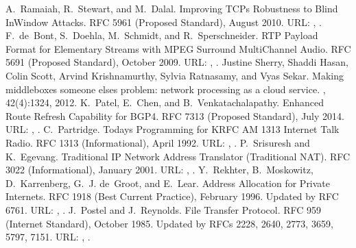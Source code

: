 \documentclass[letterpaper,10pt,english]{sphinxmanual}
\begin{document}
\begin{sphinxthebibliography}{10}
\sphinxAtStartPar
A. Ramaiah, R. Stewart, and M. Dalal. Improving TCP\textquotesingle{}s Robustness to Blind In\sphinxhyphen{}Window Attacks. RFC 5961 (Proposed Standard), August 2010. URL: , .
\sphinxAtStartPar
F. de Bont, S. Doehla, M. Schmidt, and R. Sperschneider. RTP Payload Format for Elementary Streams with MPEG Surround Multi\sphinxhyphen{}Channel Audio. RFC 5691 (Proposed Standard), October 2009. URL: , .
\sphinxAtStartPar
Justine Sherry, Shaddi Hasan, Colin Scott, Arvind Krishnamurthy, Sylvia Ratnasamy, and Vyas Sekar. Making middleboxes someone else\textquotesingle{}s problem: network processing as a cloud service. , 42(4):13\textendash{}24, 2012.
\sphinxAtStartPar
K. Patel, E. Chen, and B. Venkatachalapathy. Enhanced Route Refresh Capability for BGP\sphinxhyphen{}4. RFC 7313 (Proposed Standard), July 2014. URL: , .
\sphinxAtStartPar
C. Partridge. Today\textquotesingle{}s Programming for KRFC AM 1313 Internet Talk Radio. RFC 1313 (Informational), April 1992. URL: , .
\sphinxAtStartPar
P. Srisuresh and K. Egevang. Traditional IP Network Address Translator (Traditional NAT). RFC 3022 (Informational), January 2001. URL: , .
\sphinxAtStartPar
Y. Rekhter, B. Moskowitz, D. Karrenberg, G. J. de Groot, and E. Lear. Address Allocation for Private Internets. RFC 1918 (Best Current Practice), February 1996. Updated by RFC 6761. URL: , .
\sphinxAtStartPar
J. Postel and J. Reynolds. File Transfer Protocol. RFC 959 (Internet Standard), October 1985. Updated by RFCs 2228, 2640, 2773, 3659, 5797, 7151. URL: , .

\end{sphinxthebibliography}
\end{document}
